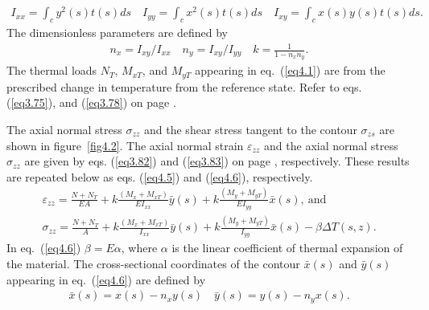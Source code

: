 \documentclass{AeroStructure-ERJohnson}
\begin{document}
\begin{align}\label{eq4.3}
I_{x x}=\int_{c} y^{2}(s) t(s) d s \quad I_{y y}=\int_{c} x^{2}(s) t(s) d s \quad I_{x y}=\int_{c} x(s) y(s) t(s) ds.
\end{align}
The dimensionless parameters are defined by
\begin{align}\label{eq4.4}
n_{x}=I_{x y}/I_{x x} \quad n_{y}=I_{x y}/I_{y y} \quad k=\frac{1}{1-n_{x} n_{y}}.
\end{align}
The thermal loads $N_{T}$, $M_{x T}$, and $M_{y T}$ appearing in eq.~(\ref{eq4.1}) are from the prescribed change in temperature from the reference state. Refer to eqs. (\ref{eq3.75}), and (\ref{eq3.78}) on page \pageref{eq3.75}.


The axial normal stress $\sigma_{z z}$ and the shear stress tangent to the contour $\sigma_{z s}$ are shown in figure~\ref{fig4.2}. The axial normal strain $\varepsilon_{z z}$ and the axial normal stress $\sigma_{z z}$ are given by eqs. (\ref{eq3.82}) and (\ref{eq3.83}) on page \pageref{eq3.82}, respectively. These results are repeated below as eqs. (\ref{eq4.5}) and (\ref{eq4.6}), respectively.
{\def\thefigure{4.2}
}
\vspace*{-2\baselineskip}
\begin{align}\label{eq4.5}
\varepsilon_{z z}=\frac{N+N_{T}}{E A}+k \frac{\left(M_{x}+M_{x T}\right)}{E I_{x x}} \bar{y}(s)+k \frac{\left(M_{y}+M_{y T}\right)}{E I_{y y}} \bar{x}(s),\ \text{and}\\
\label{eq4.6}
\sigma_{z z}=\frac{N+N_{T}}{A}+k \frac{\left(M_{x}+M_{x T}\right)}{I_{x x}} \bar{y}(s)+k \frac{\left(M_{y}+M_{y T}\right)}{I_{y y}} \bar{x}(s)-\beta \Delta T(s, z).
\end{align}
In eq.~(\ref{eq4.6}) $\beta=E \alpha$, where $\alpha$ is the linear coefficient of thermal expansion of the material. The cross-sectional coordinates of the contour $\bar{x}(s)$ and $\bar{y}(s)$ appearing in eq.~(\ref{eq4.6}) are defined by
\begin{align}\label{eq4.7}
\bar{x}(s)=x(s)-n_{x} y(s) \quad \bar{y}(s)=y(s)-n_{y} x(s).
\end{align}
\end{document}
